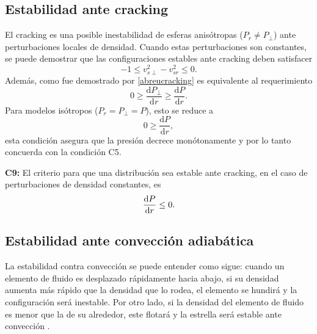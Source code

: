 \subsection*{Estabilidad ante cracking}
\noindent El cracking es una posible inestabilidad de esferas anisótropas ($P_r \neq P_{\perp}$) ante perturbaciones locales de densidad. Cuando estas perturbaciones son constantes, se puede demostrar \cite{Abreu2007} que las configuraciones estables ante cracking deben satisfacer
\begin{equation}\label{abreucracking}
    -1 \leq v_{s \perp}^{2}-v_{s r}^{2} \leq 0.
\end{equation}
Además, como fue demostrado por \cite{Ivanov2017} \eqref{abreucracking} es equivalente al requerimiento
\begin{equation}
    0 \geq \frac{\mathrm{d} P_{\perp}}{\mathrm{d} r} \geq \frac{\mathrm{d} P}{\mathrm{d} r}.
\end{equation}
Para modelos isótropos ($P_r=P_{\perp}=P$), esto se reduce a 
\begin{equation}
    0 \geq \frac{\mathrm{d} P}{\mathrm{d} r},
\end{equation}
esta condición asegura que la presión decrece monótonamente y por lo tanto concuerda con la condición C5.

\textbf{C9:} El criterio para que una distribución sea estable ante cracking, en el caso de perturbaciones de densidad constantes, es 
\begin{equation}
    \dv{P}{r} \leq 0.
\end{equation}


\subsection*{Estabilidad ante convección adiabática}

\noindent La estabilidad contra convección se puede entender como sigue: cuando un elemento de fluido es desplazado rápidamente hacia abajo, si su densidad aumenta más rápido que la densidad que lo rodea, el elemento se hundirá y la configuración será inestable. Por otro lado, si la densidad del elemento de fluido es menor que la de su alrededor, este flotará y la estrella será estable ante convección \cite{Bondi1964a}. 

